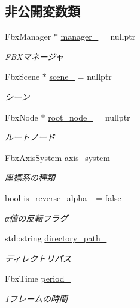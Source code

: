 \subsection*{非公開変数類}
\begin{DoxyCompactItemize}
\item 
Fbx\+Manager $\ast$ \mbox{\hyperlink{class_fbx_converter_a5c236830d34901e79030647478d3ef1b}{manager\+\_\+}} = nullptr
\begin{DoxyCompactList}\small\item\em F\+B\+Xマネージャ \end{DoxyCompactList}\item 
Fbx\+Scene $\ast$ \mbox{\hyperlink{class_fbx_converter_a64600b8f5225b7147c72105558386d78}{scene\+\_\+}} = nullptr
\begin{DoxyCompactList}\small\item\em シーン \end{DoxyCompactList}\item 
Fbx\+Node $\ast$ \mbox{\hyperlink{class_fbx_converter_ad5a43f9ee7bcf730c5f95e0ec63a4b8e}{root\+\_\+node\+\_\+}} = nullptr
\begin{DoxyCompactList}\small\item\em ルートノード \end{DoxyCompactList}\item 
Fbx\+Axis\+System \mbox{\hyperlink{class_fbx_converter_a36b80ea020d572dfff02125724af4c53}{axis\+\_\+system\+\_\+}}
\begin{DoxyCompactList}\small\item\em 座標系の種類 \end{DoxyCompactList}\item 
bool \mbox{\hyperlink{class_fbx_converter_ad88043ffdcbe995d3f1f8649395e58c9}{is\+\_\+reverse\+\_\+alpha\+\_\+}} = false
\begin{DoxyCompactList}\small\item\em α値の反転フラグ \end{DoxyCompactList}\item 
std\+::string \mbox{\hyperlink{class_fbx_converter_a542178c31548a51cd28726e2154c0f70}{directory\+\_\+path\+\_\+}}
\begin{DoxyCompactList}\small\item\em ディレクトリパス \end{DoxyCompactList}\item 
Fbx\+Time \mbox{\hyperlink{class_fbx_converter_a6d72d42a71572369aa2fed2f8710e696}{period\+\_\+}}
\begin{DoxyCompactList}\small\item\em 1フレームの時間 \end{DoxyCompactList}\item 

\end{DoxyCompactItemize}
